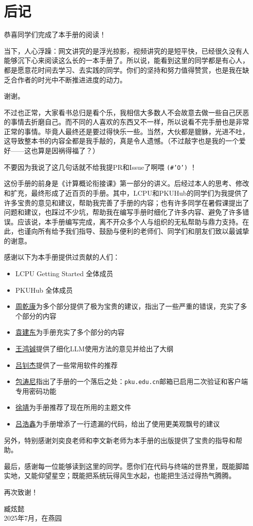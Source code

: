 \documentclass[../main.tex]{subfiles}
\begin{document}
\chapter{后记}

恭喜同学们完成了本手册的阅读！

当下，人心浮躁：网文讲究的是浮光掠影，视频讲究的是短平快，已经很久没有人能够沉下心来阅读这么长的一本手册了。所以说，能看到这里的同学都是有心人，都是愿意花时间去学习、去实践的同学。你们的坚持和努力值得赞赏，也是我在缺乏合作者的时光中不断推进进度的动力。

谢谢。

不过也正常，大家看书总归是看个乐，我相信大多数人不会故意去做一些自己厌恶的事情去折磨自己。而不同的人喜欢的东西又不一样，所以说看不完手册也是非常正常的事情。毕竟人最终还是要过得快乐一些。当然，大伙都是貔貅，光进不吐，这导致整本书的内容全都是我手敲的，真是令人遗憾。（不过敲字也是我的一个爱好——这也算是因祸得福了？）

不要因为我说了这几句话就不给我提PR和Issue了啊喂 \texttt{(\#'O')} ！

这份手册的前身是《计算概论衔接课》第一部分的讲义。后经过本人的思考、修改和扩充，最终形成了近百页的手册。其中，LCPU和PKUHub的同学们为我提供了许多宝贵的意见和建议，帮助我完善了手册的内容；也有许多同学在暑假课提出了问题和建议，也踩过不少坑，帮助我在编写手册时细化了许多内容、避免了许多错误。应该说，本手册编写完成，离不开众多个人与组织的无私帮助与鼎力支持。在此，也谨向所有给予我们指导、鼓励与便利的老师们、同学们和朋友们致以最诚挚的谢意。

感谢以下为本手册提供过贡献的人们：
\begin{itemize}
  \item LCPU Getting Started 全体成员
  \item PKUHub 全体成员
  \item \faGithub\href{https://github.com/wszqkzqk}{周乾康}为多个部分提供了极为宝贵的建议，指出了一些严重的错误，充实了多个部分的内容
  \item \faGithub\href{https://github.com/yjdyamv}{袁建东}为手册充实了多个部分的内容
  \item \faGithub\href{https://github.com/whcpumpkin}{王鸿铖}提供了细化LLM使用方法的意见并给出了大纲
  \item \faGithub\href{https://github.com/Elkeid-me}{吕钊杰}提供了一些常用软件的推荐
  \item \faGithub\href{https://github.com/AsTonyshment}{包涛尼}指出了手册的一个落后之处：\texttt{pku.edu.cn}邮箱已启用二次验证和客户端专用密码功能
  \item \faGithub\href{https://github.com/ICUlizhi}{徐靖}为手册推荐了现在所用的主题文件
  \item \faGithub\href{https://github.com/ha0xin}{吕浩鑫}为手册增添了一行遗漏的代码，给出了使用更美观飘号的建议
\end{itemize}

另外，特别感谢刘奕良老师和李文新老师为本手册的出版提供了宝贵的指导和帮助。

最后，感谢每一位能够读到这里的同学。愿你们在代码与终端的世界里，既能脚踏实地，又能仰望星空；既能把系统玩得风生水起，也能把生活过得热气腾腾。

再次致谢！

\vspace{2em}
\begin{flushright}
  臧炫懿 \\
  2025年7月，在燕园
\end{flushright}
\end{document}
